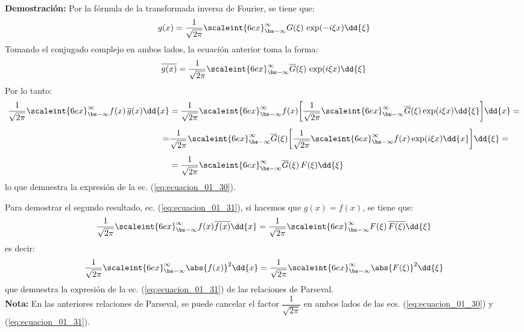 \noindent
\textbf{Demostración:} Por la fórmula de la transformada inversa de Fourier, se tiene que:
\begin{align*}
g(x) = \dfrac{1}{\sqrt{2 \pi}} \scaleint{6ex}_{\bs -\infty}^{\infty} G(\xi) \, \exp(-i \xi x) \dd{\xi}
\end{align*}
Tomando el conjugado complejo en ambos lados, la ecuación anterior toma la forma:
\begin{align*}
\overline{g(x)} = \dfrac{1}{\sqrt{2 \pi}} \scaleint{6ex}_{\bs -\infty}^{\infty} \overline{G}(\xi) \, \exp(i \xi x) \dd{\xi}
\end{align*}
Por lo tanto:
\begin{align*}
\dfrac{1}{\sqrt{2 \pi}} \scaleint{6ex}_{\bs -\infty}^{\infty} f (x) \, \overline{g}(x) \dd{x} &= \dfrac{1}{\sqrt{2 \pi}} \scaleint{6ex}_{\bs -\infty}^{\infty} f (x) \bigg[ \dfrac{1}{\sqrt{2 \pi}} \scaleint{6ex}_{\bs -\infty}^{\infty} \overline{G} (\xi) \exp(i \xi x) \dd{\xi} \bigg] \dd{x} = \\[0.5em]
=& \dfrac{1}{\sqrt{2 \pi}} \scaleint{6ex}_{\bs -\infty}^{\infty} \overline{G} (\xi) \bigg[ \dfrac{1}{\sqrt{2 \pi}} \scaleint{6ex}_{\bs -\infty}^{\infty} f (x) \exp(i \xi x) \dd{x} \bigg] \dd{\xi} = \\[0.5em]
&= \dfrac{1}{\sqrt{2 \pi}} \scaleint{6ex}_{\bs -\infty}^{\infty} \overline{G} (\xi) \, F (\xi) \dd{\xi}
\end{align*}
lo que demuestra la expresión de la ec. (\ref{eq:ecuacion_01_30}).
\par
Para demostrar el segundo resultado, ec. (\ref{eq:ecuacion_01_31}), si hacemos que $g(x) = f (x)$, se tiene que:
\begin{align*}
\dfrac{1}{\sqrt{2 \pi}} \scaleint{6ex}_{\bs -\infty}^{\infty} f (x) \overline{f (x)} \dd{x} = \dfrac{1}{\sqrt{2 \pi}} \scaleint{6ex}_{\bs -\infty}^{\infty} F (\xi) \, \overline{F (\xi)} \dd{\xi}
\end{align*}
es decir:
\begin{align*}
\dfrac{1}{\sqrt{2 \pi}} \scaleint{6ex}_{\bs -\infty}^{\infty} \abs{f (x)}^2 \dd{x} = \dfrac{1}{\sqrt{2 \pi}} \scaleint{6ex}_{\bs -\infty}^{\infty} \abs{F (\xi)}^{2} \dd{\xi}
\end{align*}
que demuestra la expresión de la ec. (\ref{eq:ecuacion_01_31}) de las relaciones de Parseval.
\\
\noindent
\textbf{Nota: } En las anteriores relaciones de Parseval, se puede cancelar el factor $\dfrac{1}{\sqrt{2 \pi}}$ en ambos lados de las ecs. (\ref{eq:ecuacion_01_30}) y (\ref{eq:ecuacion_01_31}).
